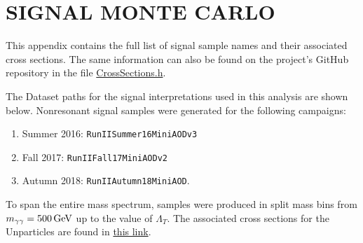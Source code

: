 \chapter{SIGNAL MONTE CARLO}
\RaggedRight \parindent=25pt
\label{ch:appendix_signal_monte_carlo}
This appendix contains the full list of signal sample names and their associated cross sections. The same information can also be found on the project's GitHub repository in the file \href{https://github.com/cms-exotica-diphotons/diphoton-analysis/blob/dbd7b7b1ea7210aa55a27dcce8e84a3a5057d265/CommonClasses/interface/CrossSections.h}{CrossSections.h}.

The Dataset paths for the signal interpretations used in this analysis are shown below. Nonresonant signal samples were generated for the following campaigns:
\begin{enumerate}
    \item Summer 2016: \texttt{RunIISummer16Mini\-AODv3}
    \item Fall 2017: \texttt{RunIIFall17\-MiniAODv2}
    \item Autumn 2018: \texttt{RunIIAutumn18MiniAOD}.
\end{enumerate}
To span the entire mass spectrum, samples were produced in split mass bins from $m_{\gamma\gamma} = 500\,\text{Ge\hspace{-.08em}V}$ up to the value of $\Lambda_T$. The associated cross sections for the Unparticles are found in \href{https://github.com/cms-exotica-diphotons/diphoton-analysis/blob/Unparticles/CommonClasses/interface/CrossSections.h}{this link}.





